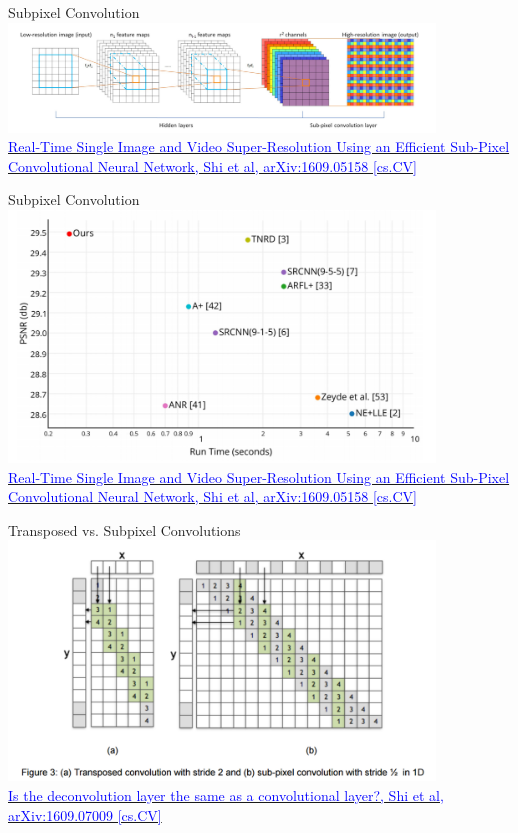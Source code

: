 \documentclass[]{beamer}
\begin{document}
\begin{frame}{Subpixel Convolution}
\centering
\includegraphics[width=0.85\textwidth]{figures/shi-subpixel} \\
\href{https://arxiv.org/abs/1609.05158}
{\textcolor{blue}{Real-Time Single Image and Video Super-Resolution Using an Efficient Sub-Pixel Convolutional Neural Network, Shi et al, arXiv:1609.05158 [cs.CV]}}
\end{frame}


\begin{frame}{Subpixel Convolution}
\centering
\includegraphics[width=0.85\textwidth]{figures/shi-subpixel-trade-off} \\
\href{https://arxiv.org/abs/1609.05158}
{\textcolor{blue}{Real-Time Single Image and Video Super-Resolution Using an Efficient Sub-Pixel Convolutional Neural Network, Shi et al, arXiv:1609.05158 [cs.CV]}}
\end{frame}


\begin{frame}{Transposed vs. Subpixel Convolutions}
\centering
\includegraphics[width=0.85\textwidth]{figures/shi-subpixel-vs-transposed} \\
\href{https://arxiv.org/abs/1609.07009}
{\textcolor{blue}{Is the deconvolution layer the same as a convolutional layer?, Shi et al, arXiv:1609.07009 [cs.CV]}}
\end{frame}
\end{document}
